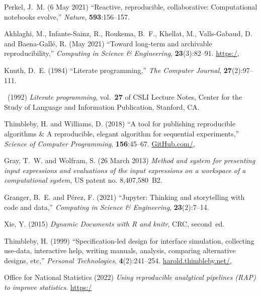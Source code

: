 \documentclass{comjnl}
\begin{document}
{\begin{thebibliography}{100}
Perkel, J.~M. (6 May 2021) ``Reactive, reproducible, collaborative:
  Computational notebooks evolve,'' {\em Nature}, \textbf{593}:156--157.
\newblock {}

Akhlaghi, M., Infante-Sainz, R., Roukema, B.~F., Khellat, M., Valls-Gabaud, D.
  and Baena-Gall{\'e}, R. (May 2021) ``Toward long-term and archivable
  reproducibility,'' {\em Computing in Science {\&} Engineering},
  \textbf{23}(3):82--91.
\newblock \url{https:/}\midurl{/},

Knuth, D.~E. (1984) ``Literate programming,'' {\em The Computer Journal},
  \textbf{27}(2):97--111.
\newblock {}

\leavevmode\vrule height 2pt depth -1.6pt width 23pt\  (1992) {\em Literate
  programming}, vol.~\textbf{27} of {CSLI} Lecture Notes, Center for the Study
  of Language and Information Publication, Stanford, {CA}.

Thimbleby, H. and Williams, D. (2018) ``A tool for publishing reproducible
  algorithms {\&} {A} reproducible, elegant algorithm for sequential
  experiments,'' {\em Science of Computer Programming}, \textbf{156}:45--67.
\newblock \url{GitHub.com/},

Gray, T.~W. and Wolfram, S. (26 March 2013) {\em Method and system for
  presenting input expressions and evaluations of the input expressions on a
  workspace of a computational system}, US patent no{\@.} 8,407,580~B2.

Granger, B.~E. and P{\'e}rez, F. (2021) ``Jupyter: {Thinking} and storytelling
  with code and data,'' {\em Computing in Science {\&} Engineering},
  \textbf{23}(2):7--14.
\newblock {}

Xie, Y. (2015) {\em Dynamic Documents with {R} and knitr}, CRC, second~ed.

Thimbleby, H. (1999) ``Specification-led design for interface simulation,
  collecting use-data, interactive help, writing manuals, analysis, comparing
  alternative designs, etc,'' {\em Personal Technologies},
  \textbf{4}(2):241--254.
\newblock \url{harold.thimbleby.net/}, 

{Office for National Statistics} (2022) {\em Using reproducible analytical
  pipelines ({RAP}) to improve statistics}.
\newblock
  \url{https:/}\midurl{/}\midurl{}


\end{thebibliography}}
\end{document}
